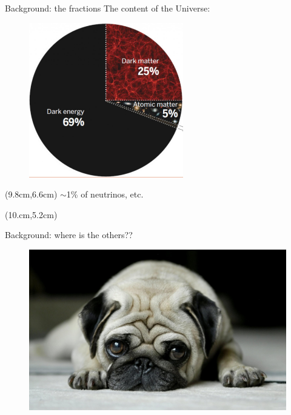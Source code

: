 \documentclass[aspectratio=43]{beamer}
\begin{document}
\begin{frame}{Background: the fractions}
The content of the Universe:
  \begin{figure}
    \includegraphics[width=0.6\textwidth]{fraction.jpg}
  \end{figure}
  \begin{textblock*}{3cm}(9.8cm,6.6cm)
    {$\sim$1\% of neutrinos, etc.}
  \end{textblock*}
  \begin{textblock*}{2.6cm}(10.cm,5.2cm)
    {\color{red}{Stars only account for $\sim$0.07\%}}
  \end{textblock*}
\end{frame}

\begin{frame}{Background: where is the others??}
  \begin{figure}
    \includegraphics[width=\textwidth]{lonely-dog.jpg}
  \end{figure}
\end{frame}
\end{document}
